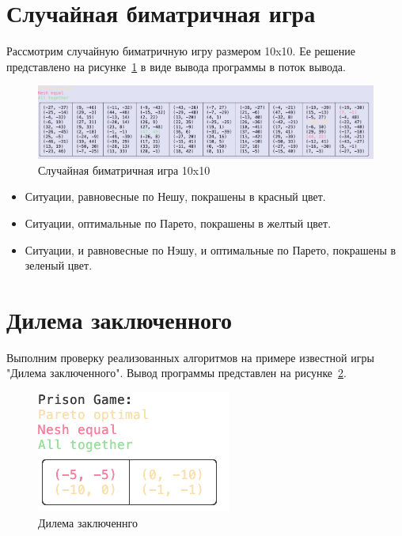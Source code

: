 \section{Случайная биматричная игра}

Рассмотрим случайную биматричную игру размером 10x10. Ее решение представлено на
рисунке~\ref{fig:fig01} в виде вывода программы в поток вывода.

\begin{figure}
  \centering
  \includegraphics[scale=0.3]{../../artifacts/lw3/random_game.png}
  \caption{Случайная биматричная игра 10x10}
  \label{fig:fig01}
\end{figure}

\begin{itemize}
  \item Ситуации, равновесные по Нешу, покрашены в красный цвет.
  \item Ситуации, оптимальные по Парето, покрашены в желтый цвет.
  \item Ситуации, и равновесные по Нэшу, и оптимальные по Парето, покрашены в
        зеленый цвет.
\end{itemize}

\section{Дилема заключенного}

Выполним проверку реализованных алгоритмов на примере известной игры "Дилема
заключенного".
Вывод программы представлен на рисунке~\ref{fig:fig02}.

\begin{figure}
  \centering
  \includegraphics[scale=0.7]{../../artifacts/lw3/prison_game.png}
  \caption{Дилема заключеннго}
  \label{fig:fig02}
\end{figure}

